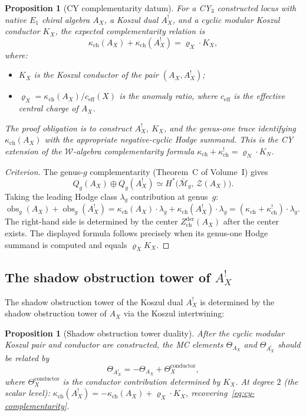\documentclass[11pt]{article}
\newtheorem{proposition}[theorem]{Proposition}
\theoremstyle{definition}
\theoremstyle{remark}
\DeclareMathOperator{\obs}{obs}
\newcommand{\cM}{\mathcal{M}}
\newcommand{\cW}{\mathcal{W}}
\newcommand{\cZ}{\mathcal{Z}}
\begin{document}
\begin{proposition}[CY complementarity datum]
\label{thm:cy-complementarity}
For a CY$_3$ constructed locus with native $E_1$ chiral algebra $A_X$,
a Koszul dual $A^!_X$, and a cyclic modular Koszul conductor $K_X$, the
expected complementarity relation is
\begin{equation}\label{eq:cy-complementarity}
\kappa_{\mathrm{ch}}(A_X) + \kappa_{\mathrm{ch}}(A^!_X) = \varrho_X \cdot K_X,
\end{equation}
where:
\begin{itemize}
\item $K_X$ is the Koszul conductor of the pair $(A_X,A_X^!)$;
\item $\varrho_X = \kappa_{\mathrm{ch}}(A_X) / c_{\mathrm{eff}}(X)$ is the anomaly
ratio, where $c_{\mathrm{eff}}$ is the effective central charge of
$A_X$.
\end{itemize}
The proof obligation is to construct $A_X^!$, $K_X$, and the genus-one
trace identifying $\kappa_{\mathrm{ch}}(A_X)$ with the appropriate
negative-cyclic Hodge summand. This is the CY extension of the
$\cW$-algebra complementarity formula
$\kappa_{\mathrm{ch}} + \kappa_{\mathrm{ch}}^! = \varrho_N \cdot K_N$.
\end{proposition}

\begin{proof}[Criterion]
The genus-$g$ complementarity (Theorem~C of Volume~I) gives
\[
Q_g(A_X) \oplus Q_g(A^!_X) \simeq
H^*\bigl(\overline{\cM}_g,\, \cZ(A_X)\bigr).
\]
Taking the leading Hodge class $\lambda_g$ contribution at genus~$g$:
$\obs_g(A_X) + \obs_g(A^!_X) = \kappa_{\mathrm{ch}}(A_X) \cdot \lambda_g +
\kappa_{\mathrm{ch}}(A^!_X) \cdot \lambda_g = (\kappa_{\mathrm{ch}} + \kappa_{\mathrm{ch}}^!) \cdot \lambda_g$.
The right-hand side is determined by the center
$Z^{\mathrm{der}}_{\mathrm{ch}}(A_X)$ after the center exists. The
displayed formula follows precisely when its genus-one Hodge summand is
computed and equals $\varrho_X K_X$.
\end{proof}

\subsection{The shadow obstruction tower of $A^!_X$}

The shadow obstruction tower of the Koszul dual $A^!_X$ is determined by the
shadow obstruction tower of $A_X$ via the Koszul intertwining:

\begin{proposition}[Shadow obstruction tower duality]
\label{prop:shadow-duality}
After the cyclic modular Koszul pair and conductor are constructed, the
MC elements $\Theta_{A_X}$ and $\Theta_{A^!_X}$ should be related by
\begin{equation}\label{eq:shadow-duality}
\Theta_{A^!_X} = -\Theta_{A_X} + \Theta^{\mathrm{conductor}}_X,
\end{equation}
where $\Theta^{\mathrm{conductor}}_X$ is the conductor contribution
determined by $K_X$. At degree $2$ (the scalar level):
$\kappa_{\mathrm{ch}}(A^!_X) = -\kappa_{\mathrm{ch}}(A_X) + \varrho_X \cdot K_X$,
recovering~\eqref{eq:cy-complementarity}.
\end{proposition}
\end{document}
